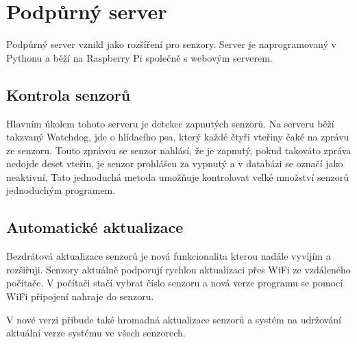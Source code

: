 \chapter{Podpůrný server}
Podpůrný server vznikl jako rozšíření pro senzory.
Server je naprogramovaný v Pythonu a běží na Raspberry Pi společně s webovým serverem.  


\section{Kontrola senzorů}
Hlavním úkolem tohoto serveru je detekce zapnutých senzorů.
Na serveru běží takzvaný Watchdog, jde o hlídacího psa, který každé čtyři vteřiny čaké na zprávu ze senzoru.
Touto zprávou se senzor nahlásí, že je zapnutý, pokud takováto zpráva nedojde deset vteřin, je senzor prohlášen za vypnutý a v databázi se označí jako neaktivní.
Tato jednoduchá metoda umožňuje kontrolovat velké množství senzorů jednoduchým programem.

\section{Automatické aktualizace}
Bezdrátová aktualizace senzorů je nová funkcionalita kterou nadále vyvíjím a rozšiřuji.
Senzory aktuálně podporují rychlou aktualizaci přes WiFi ze vzdáleného počítače.
V počítači stačí vybrat číslo senzoru a nová verze programu se pomocí WiFi připojení nahraje do senzoru.

V nové verzi přibude také hromadná aktualizace senzorů a systém na udržování aktuální verze systému ve všech senzorech.




\newpage